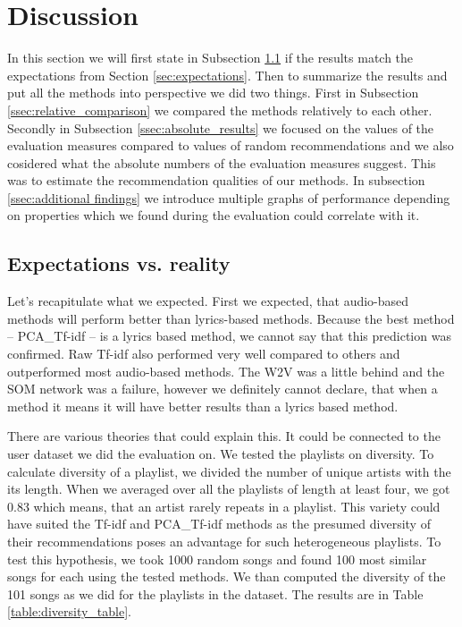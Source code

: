 \section{Discussion}\label{sec:discussion}
In this section we will first state in Subsection \ref{ssec:exp_vs_reality} 
if the results match the expectations from Section \ref{sec:expectations}. Then to summarize the results and put all the 
methods into perspective we did two things. First in Subsection 
\ref{ssec:relative_comparison} we compared the methods relatively to each 
other. Secondly in Subsection \ref{ssec:absolute_results} we focused on the 
values of the evaluation measures compared to values of random recommendations and we also cosidered what the absolute numbers of the evaluation measures suggest. This was to estimate the recommendation qualities of our methods. In subsection \ref{ssec:additional findings} we introduce multiple graphs of performance depending on properties which we found during the evaluation could correlate with it. \\

\subsection{Expectations vs. reality}\label{ssec:exp_vs_reality}
Let's recapitulate what we expected. First we expected, that audio-based methods will perform better than lyrics-based methods. Because the best
method -- PCA\_Tf-idf -- is a lyrics based method, we cannot say that this 
prediction was confirmed. Raw Tf-idf also performed very well compared to 
others and outperformed most audio-based methods.  The W2V was a little 
behind and the SOM network was a failure, however we definitely cannot declare,
that when a method it means it will have better results than a lyrics based method.

There are various theories that could explain this. It could be connected to the user dataset we did the evaluation on. We tested the playlists on 
diversity. To calculate diversity of a playlist, we divided the number of unique artists with the its length. When we averaged over all the playlists of length at least four, we got 0.83 which means, that an 
artist rarely repeats in a playlist. This variety could have suited the 
Tf-idf and PCA\_Tf-idf methods as the presumed diversity of their recommendations poses 
an advantage for such heterogeneous playlists. To test this hypothesis, we 
took 1000 random songs and found 100 most similar songs for each using the tested methods. We than computed the diversity of the 101 songs as we did for the playlists in the dataset. The results are in Table \ref{table:diversity_table}. \\

